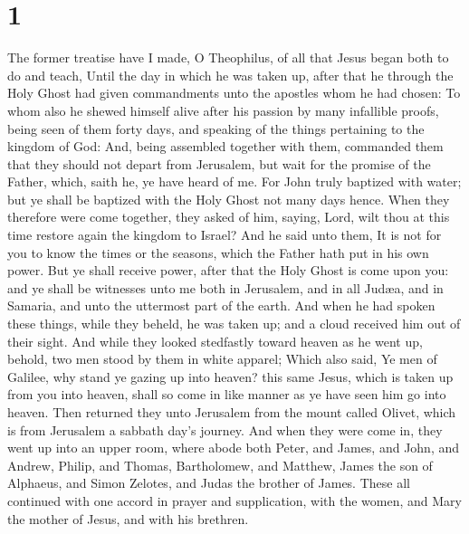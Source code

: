 \hypertarget{section}{%
\section{1}\label{section}}

 The former treatise have I made, O Theophilus, of all that
Jesus began both to do and teach,  Until the day in which he
was taken up, after that he through the Holy Ghost had given
commandments unto the apostles whom he had chosen:  To whom
also he shewed himself alive after his passion by many infallible
proofs, being seen of them forty days, and speaking of the things
pertaining to the kingdom of God:  And, being assembled
together with them, commanded them that they should not depart from
Jerusalem, but wait for the promise of the Father, which, saith he, ye
have heard of me.  For John truly baptized with water; but
ye shall be baptized with the Holy Ghost not many days hence.
 When they therefore were come together, they asked of him,
saying, Lord, wilt thou at this time restore again the kingdom to
Israel?  And he said unto them, It is not for you to know
the times or the seasons, which the Father hath put in his own power.
 But ye shall receive power, after that the Holy Ghost is
come upon you: and ye shall be witnesses unto me both in Jerusalem, and
in all Judæa, and in Samaria, and unto the uttermost part of the earth.
 And when he had spoken these things, while they beheld, he
was taken up; and a cloud received him out of their sight. 
And while they looked stedfastly toward heaven as he went up, behold,
two men stood by them in white apparel;  Which also said,
Ye men of Galilee, why stand ye gazing up into heaven? this same Jesus,
which is taken up from you into heaven, shall so come in like manner as
ye have seen him go into heaven.  Then returned they unto
Jerusalem from the mount called Olivet, which is from Jerusalem a
sabbath day's journey.  And when they were come in, they
went up into an upper room, where abode both Peter, and James, and John,
and Andrew, Philip, and Thomas, Bartholomew, and Matthew, James the son
of Alphaeus, and Simon Zelotes, and Judas the brother of James.
 These all continued with one accord in prayer and
supplication, with the women, and Mary the mother of Jesus, and with his
brethren.

